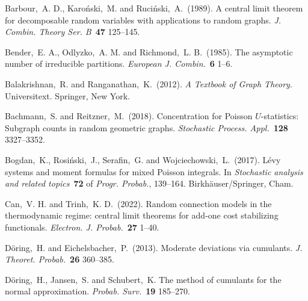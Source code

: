 \documentclass[bj,authoryear,noshowframe]{imsart}
\theoremstyle{plain}
\theoremstyle{remark}
\begin{document}

\begin{thebibliography}{4}
  Barbour,~A. D., Karo{\'n}ski,~M. and Ruci{\'n}ski,~A.~(1989).
  A central limit theorem for decomposable random variables with
    applications to random graphs. \textit{J. Combin. Theory Ser. B}~\textbf{47} 125--145.
  
  Bender,~E. A., Odlyzko,~A. M. and Richmond,~L. B.~(1985). The asymptotic number of irreducible partitions. \textit{European J. Combin.}~\textbf{6} 1--6.


  Balakrishnan,~R. and Ranganathan,~K.~(2012).
  \textit{A Textbook of Graph Theory}.
  Universitext. Springer, New York.

  Bachmann,~S. and Reitzner,~M.~(2018). 
  Concentration for Poisson $U$-statistics: Subgraph counts in random geometric graphs.
  \textit{Stochastic Process. Appl.}~\textbf{128} 3327--3352.

  Bogdan,~K., Rosi\'{n}ski,~J., Serafin,~G. and Wojciechowski,~L.~(2017).
  L\'{e}vy systems and moment formulas for mixed Poisson integrals.
  In \textit{Stochastic analysis and related topics}~\textbf{72} of \textit{Progr. Probab.}, 139--164. Birkh{\"{a}}user/Springer, Cham.

  Can,~V. H. and Trinh,~K. D.~(2022).
  Random connection models in the thermodynamic regime: central limit theorems for add-one cost stabilizing functionals.
  \textit{Electron. J. Probab.}~\textbf{27} 1--40.

  D{\"{o}}ring,~H. and Eichelsbacher,~P.~(2013).
  Moderate deviations via cumulants.
  \textit{J. Theoret. Probab.}~\textbf{26} 360--385.

  D{\"o}ring,~H., Jansen,~S. and Schubert,~K.
  The method of cumulants for the normal approximation.
  \textit{Probab. Surv.}~\textbf{19} 185--270.


\end{thebibliography}
\end{document}
